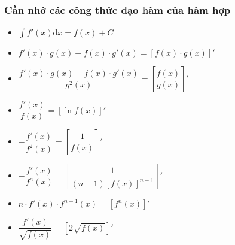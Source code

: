 \setcounter{demsochude}{2}

\subsubsection*{Cần nhớ các công thức đạo hàm của hàm hợp}
\begin{itemize}[\color{blue}\faPencilSquare]
	\item $\int{f'(x)\mathrm{d}x}=f(x)+C$
	\item $f'(x)\cdot g(x)+f(x)\cdot g'(x)=\left[f(x)\cdot g(x)\right]'$	
	\item $\dfrac{f'(x)\cdot g(x)-f(x)\cdot g'(x)}{g^2(x)} =\left[\dfrac{f(x)}{g(x)}\right]'$
	\item $\dfrac{f'(x)}{f(x)}=\left[\ln f(x) \right]'$
	\item $-\dfrac{f'(x)}{f^2(x)}=\left[ \dfrac{1}{f(x)} \right]'$				
	\item $-\dfrac{f'(x)}{f^n(x)}=\left[ \dfrac{1}{(n-1)\left[ f(x) \right]^{n-1}} \right]'$
	\item $n\cdot f'(x)\cdot f^{n-1}(x)=\left[ f^n(x) \right]'$
	\item $\dfrac{f'(x)}{\sqrt{f(x)}}=\left[ 2\sqrt{f(x)} \right]'$
\end{itemize}

